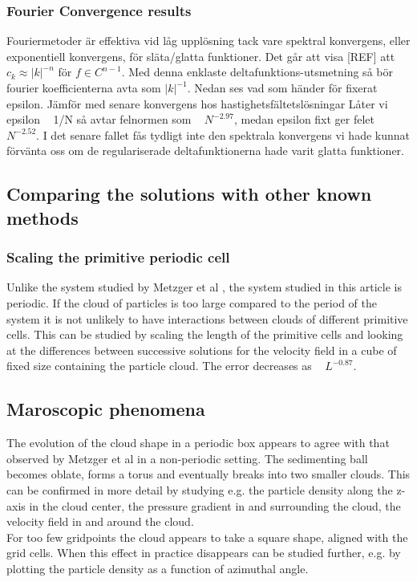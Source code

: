 \documentclass[a4paper,twoside=false,abstract=false,numbers=noenddot,
titlepage=false,headings=small,parskip=half,version=last]{scrartcl}
\begin{document}
\subsubsection{Fourier Convergence results}
Fouriermetoder är effektiva vid låg upplösning tack vare spektral konvergens, eller exponentiell konvergens, för släta/glatta funktioner. Det går att visa [REF] att $c_k \approx |k|^{-n}$ för $f \in C^{n-1}$.
Med denna enklaste deltafunktions-utsmetning så bör fourier koefficienterna avta som $|k|^{-1}$.
Nedan ses vad som händer för fixerat epsilon. Jämför med senare 
konvergens hos hastighetsfältetslösningar
Låter vi epsilon ~ 1/N så avtar felnormen som ~ $N^{-2.97}$, medan epsilon fixt ger felet ~ $N^{-2.52}$. I det senare fallet fås tydligt inte den spektrala konvergens vi hade kunnat förvänta oss om de regulariserade deltafunktionerna hade varit glatta funktioner.
\subsection{Comparing the solutions with other known methods}
\subsubsection{Scaling the primitive periodic cell}\label{cellscale}
Unlike the system studied by Metzger et al \cite{fallingclouds}, the system studied in this article is periodic. If the cloud of particles is too large compared to the period of the system it is not unlikely to have interactions between clouds of different primitive cells. This can be studied by scaling the length of the primitive cells and looking at the differences between successive solutions for the velocity field in a cube of fixed size containing the particle cloud. The error decreases as ~ $L^{-0.87}$.

\subsection{Maroscopic phenomena}
The evolution of the cloud shape in a periodic box appears to agree with that observed by Metzger et al \cite{fallingclouds} in a non-periodic setting. The sedimenting ball becomes oblate, forms a torus and eventually breaks into two smaller clouds. This can be confirmed in more detail by studying e.g. the particle density along the z-axis in the cloud center, the pressure gradient in and surrounding the cloud, the velocity field in and around the cloud.\\
For too few gridpoints the cloud appears to take a square shape, aligned with the grid cells. When this effect in practice disappears can be studied further, e.g. by plotting the particle density as a function of azimuthal angle.\\
\end{document}
